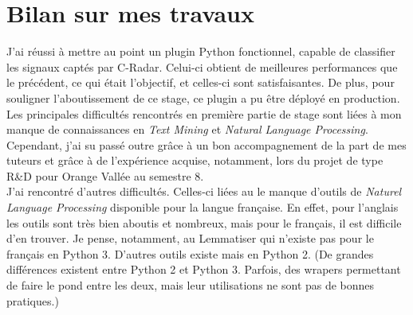 \section{Bilan sur mes travaux}
    J'ai réussi à mettre au point un plugin Python fonctionnel, capable de classifier les signaux captés par C-Radar. Celui-ci obtient de meilleures performances que le précédent, ce qui était l'objectif, et celles-ci sont satisfaisantes. De plus, pour souligner l'aboutissement de ce stage, ce plugin a pu être déployé en production.\\

    Les principales difficultés rencontrés en première partie de stage sont liées à mon manque de connaissances en \textit{Text Mining} et \textit{Natural Language Processing}. Cependant, j'ai su passé outre grâce à un bon accompagnement de la part de mes tuteurs et grâce à de l’expérience acquise, notamment, lors du projet de type R\&D pour Orange Vallée au semestre 8.\\

    J'ai rencontré d'autres difficultés. Celles-ci liées au le manque d'outils de \textit{Naturel Language Processing} disponible pour la langue française. En effet, pour l'anglais les outils sont très bien aboutis et nombreux, mais pour le français, il est difficile d'en trouver. Je pense, notamment, au Lemmatiser qui n'existe pas pour le français en Python 3. D'autres outils existe mais en Python 2. (De grandes différences existent entre Python 2 et Python 3. Parfois, des wrapers permettant de faire le pond entre les deux, mais leur utilisations ne sont pas de bonnes pratiques.)\\

